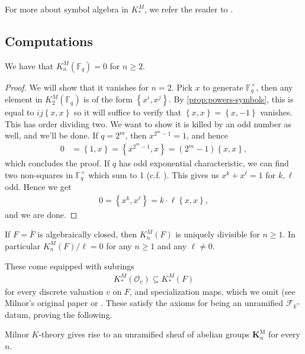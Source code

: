 \documentclass[11pt,openany]{book}
\providecommand{\KM}{\mathbf{K}^\mathrm{M}}
\begin{document}
For more about symbol algebra in $K_\ast^M$, we refer the reader to \cite[\S7.1]{GilleSzamuely}.


\subsection{Computations}

%
\begin{example} \cite[III.6.1,~III.7.2]{Kbook}
We have that $K_n^M(\mathbb{F}_q) =0$ for $n\ge 2$.
\end{example}
\begin{proof} We will show that it vanishes for $n=2$. Pick $x$ to generate $\mathbb{F}_q^\times$, then any element in $K_2^M(\mathbb{F}_q)$ is of the form $\left\{ x^i,x^j \right\}$. By \autoref{prop:powers-symbols}, this is equal to $ij \left\{ x,x \right\}$ so it will suffice to verify that $\left\{ x,x \right\} = \left\{ x,-1 \right\}$ vanishes. This has order dividing two. We want to show it is killed by an odd number as well, and we'll be done. If $q = 2^m$, then $x^{2^m-1}=1$, and hence
\begin{align*}
    0 &= \left\{ 1,x \right\} = \left\{ x^{2^m-1},x \right\} = \left( 2^m-1 \right)\left\{ x,x \right\},
\end{align*}
which concludes the proof. If $q$ has odd exponential characteristic, we can find two non-squares in $\mathbb{F}_q^\times$ which sum to 1 (c.f. \cite[1.3.6]{GilleSzamuely}). This gives us $x^k + x^\ell = 1$ for $k,\ell$ odd. Hence we get
\begin{align*}
    0 = \left\{ x^k,x^\ell \right\} = k\cdot \ell\left\{ x,x \right\},
\end{align*}
and we are done.
\end{proof}



\begin{example} \cite[III.7.2]{Kbook}
If $F = \bar{F}$ is algebraically closed, then $K_n^M(F)$ is uniquely divisible for $n\ge1$. In particular $K_n^M(F)/\ell = 0$ for any $n\ge 1$ and any $\ell\ne 0$.
\end{example}

%
These come equipped with subrings
\begin{align*}
    K^M_\ast(\mathcal{O}_v) \subseteq K^M_\ast(F)
\end{align*}
for every discrete valuation $v$ on $F$, and specialization maps, which we omit (see Milnor's original paper or \cite[7.3]{Kbook}. These satisfy the axioms for being an unramified $\mathcal{F}_k$-datum, proving the following.
\begin{proposition} Milnor $K$-theory gives rise to an unramified sheaf of abelian groups $\KM_n$ for every $n$.
\end{proposition}
\end{document}
